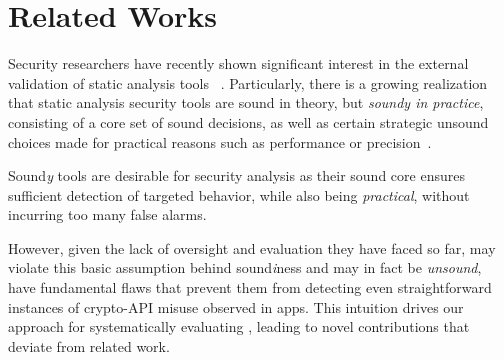 \section{Related Works}
\label{ch1:sec:relatedworks}

Security researchers have recently shown significant interest in the external validation of static analysis tools
 ~\cite{QWR18,droidbench,iccbench,PBW18,bkm+18,}. %
Particularly, there is a growing realization that static analysis security tools are sound in theory, but {\em soundy in practice}, \ie consisting of a core set of sound decisions, as well as certain strategic unsound choices made for practical reasons such as performance or precision~\cite{lss+15}.

Sound{\em y} tools are desirable for security analysis as their sound core ensures sufficient detection of targeted behavior, while also being {\em practical}, \ie without incurring too many false alarms.

However, given the lack of oversight and evaluation they have faced so far, {\em \detectors} may violate this basic assumption behind sound{\em i}ness and may in fact be {\em unsound}, \ie have fundamental flaws that prevent them from detecting even straightforward instances of crypto-API misuse observed in apps.
This intuition drives our approach for systematically evaluating \detectors, leading to novel contributions that deviate from related work.

